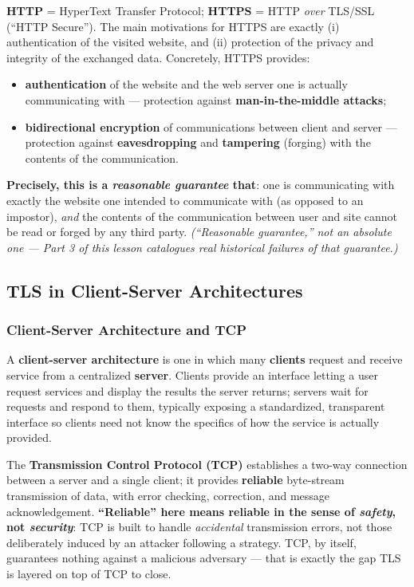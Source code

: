 \documentclass[12pt, a4paper]{article}
\begin{document}
\textbf{HTTP} = HyperText Transfer Protocol; \textbf{HTTPS} = HTTP \emph{over} TLS/SSL (``HTTP Secure''). The main motivations for HTTPS are exactly (i) authentication of the visited website, and (ii) protection of the privacy and integrity of the exchanged data. Concretely, HTTPS provides:
\begin{itemize}
    \item \textbf{authentication} of the website and the web server one is actually communicating with --- protection against \textbf{man-in-the-middle attacks};
    \item \textbf{bidirectional encryption} of communications between client and server --- protection against \textbf{eavesdropping} and \textbf{tampering} (forging) with the contents of the communication.
\end{itemize}
\textcolor{blue!50!black}{\textbf{Precisely, this is a \emph{reasonable guarantee} that}}: one is communicating with exactly the website one intended to communicate with (as opposed to an impostor), \emph{and} the contents of the communication between user and site cannot be read or forged by any third party. \emph{(``Reasonable guarantee,'' not an absolute one --- Part 3 of this lesson catalogues real historical failures of that guarantee.)}

\subsection{TLS in Client-Server Architectures}

\subsubsection{Client-Server Architecture and TCP}
A \textbf{client-server architecture} is one in which many \textbf{clients} request and receive service from a centralized \textbf{server}. Clients provide an interface letting a user request services and display the results the server returns; servers wait for requests and respond to them, typically exposing a standardized, transparent interface so clients need not know the specifics of how the service is actually provided.

The \textbf{Transmission Control Protocol (TCP)} establishes a two-way connection between a server and a single client; it provides \textbf{reliable} byte-stream transmission of data, with error checking, correction, and message acknowledgement. \textcolor{red!70!black}{\textbf{``Reliable'' here means reliable in the sense of \emph{safety}, not \emph{security}}}: TCP is built to handle \emph{accidental} transmission errors, not those deliberately induced by an attacker following a strategy. TCP, by itself, guarantees nothing against a malicious adversary --- that is exactly the gap TLS is layered on top of TCP to close.
\end{document}
